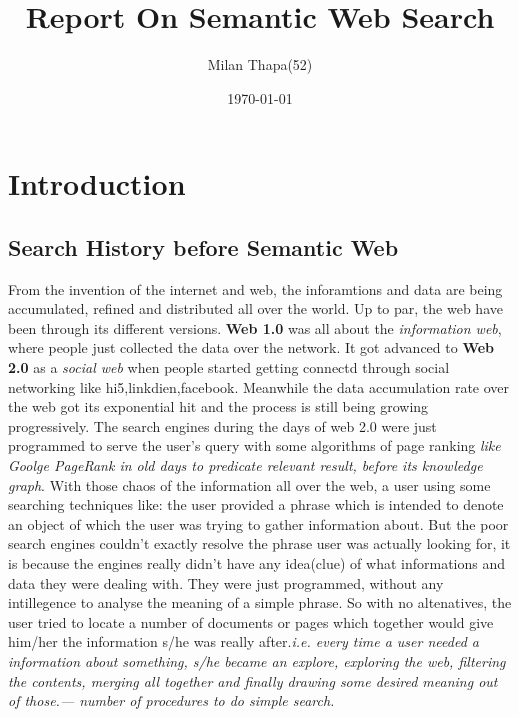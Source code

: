 \documentclass[12pt,a4]{article}
\title{Report On Semantic Web Search}
\author{Milan Thapa(52)}
\date{\today}
\begin{document}

\clearpage

\setcounter{page}{2}
\tableofcontents
\newpage
\section{Introduction}

\subsection{Search History before Semantic Web}
From the invention of the internet and web, the inforamtions and data are being accumulated, refined and distributed all over the world. Up to par, the web have been through its different versions. \textbf{Web 1.0} was all about the \textit{information web}, where people just collected the data over the network. It got advanced to \textbf{Web 2.0} as a \textit{social web} when people started getting connectd through social networking like hi5,linkdien,facebook. Meanwhile the data accumulation rate over the web got its exponential hit and the process is still being growing progressively. The search engines during the days of web 2.0  were just programmed to serve the user's query with some algorithms of page ranking \textit{like Goolge PageRank in old days to predicate relevant result, before its knowledge graph}. With those chaos of the information all over the web, a user using some searching techniques like: the user provided a phrase which is intended to denote an object of which the user was trying to gather information about. But the poor search engines couldn't exactly resolve the phrase user was actually looking for, it is because the engines really didn't have any idea(clue) of what informations and data they were dealing with. They were just programmed, without any intillegence to analyse the meaning of a simple phrase. So with no altenatives, the user tried to locate a number of documents or pages which together would give him/her the information s/he was really after.\textit{i.e. every time a user needed a information about something, s/he became an explore, exploring the web, filtering the contents, merging all together and finally drawing some desired meaning out of those.--- number of procedures to do simple search.}
\end{document}
